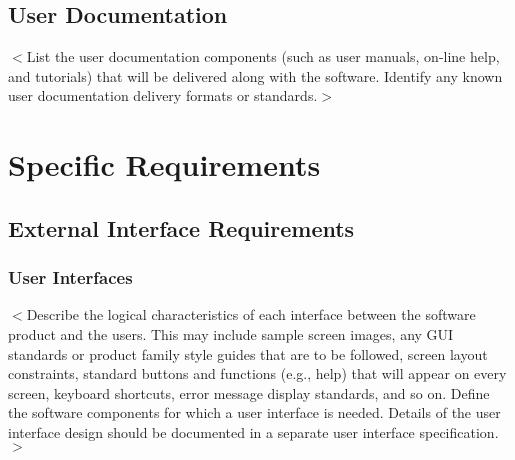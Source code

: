 \documentclass[a4paper, 11pt]{scrreprt}
\begin{document}
\section{User Documentation}
$<$List the user documentation components (such as user manuals, on-line help, 
and tutorials) that will be delivered along with the software. Identify any 
known user documentation delivery formats or standards.$>$


\chapter{Specific Requirements}

\section{External Interface Requirements}
\subsection{User Interfaces}
$<$Describe the logical characteristics of each interface between the software 
product and the users. This may include sample screen images, any GUI standards 
or product family style guides that are to be followed, screen layout 
constraints, standard buttons and functions (e.g., help) that will appear on 
every screen, keyboard shortcuts, error message display standards, and so on.  
Define the software components for which a user interface is needed. Details of 
the user interface design should be documented in a separate user interface 
specification.$>$
\end{document}

